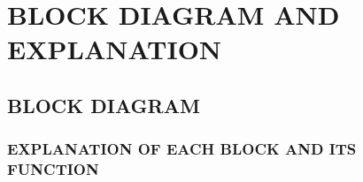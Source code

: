 \section{BLOCK DIAGRAM AND EXPLANATION}

\subsection{BLOCK DIAGRAM}

\subsubsection{EXPLANATION OF EACH BLOCK AND ITS FUNCTION}


\newpage